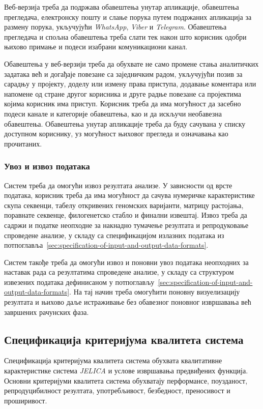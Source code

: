 \documentclass[12pt,oneside]{memoir}
\begin{document}
Веб-верзија треба да подржава обавештења унутар апликације, обавештења прегледача, електронску пошту и слање порука путем подржаних апликација за размену порука, укључујући \textit{WhatsApp}, \textit{Viber} и \textit{Telegram}. Обавештења прегледача и спољна обавештења треба слати тек након што корисник одобри њихово примање и подеси изабрани комуникациони канал.

Обавештења у веб-верзији треба да обухвате не само промене стања аналитичких задатака већ и догађаје повезане са заједничким радом, укључујући позив за сарадњу у пројекту, доделу или измену права приступа, додавање коментара или напомене од стране другог корисника и друге радње повезане са пројектима којима корисник има приступ. Корисник треба да има могућност да засебно подеси канале и категорије обавештења, као и да искључи необавезна обавештења. Обавештења унутар апликације треба да буду сачувана у списку доступном кориснику, уз могућност њиховог прегледа и означавања као прочитаних.


\subsubsection{Увоз и извоз података}
Систем треба да омогући извоз резултата анализе. У зависности од врсте података, корисник треба да има могућност да сачува нумеричке карактеристике скупа секвенци, табелу откривених геномских варијанти, матрицу растојања, поравнате секвенце, филогенетско стабло и финални извештај. Извоз треба да садржи и податке неопходне за накнадно тумачење резултата и репродуковање спроведене анализе, у складу са спецификацијом излазних података из потпоглавља~\ref{sec:specification-of-input-and-output-data-formats}.

Систем такође треба да омогући извоз и поновни увоз података неопходних за наставак рада са резултатима спроведене анализе, у складу са структуром извезених података дефинисаном у потпоглављу~\ref{sec:specification-of-input-and-output-data-formats}. На тај начин треба омогућити поновну визуелизацију резултата и њихово даље истраживање без обавезног поновног извршавања већ завршених рачунских фаза.


\subsection{Спецификација критеријума квалитета система}
\label{sec:specification-of-system-quality-criteria}
Спецификација критеријума квалитета система обухвата квалитативне карактеристике система \textit{JELICA} и услове извршавања предвиђених функција. Основни критеријуми квалитета система обухватају перформансе, поузданост, репродуцибилност резултата, употребљивост, безбедност, преносивост и проширивост.
\end{document}

